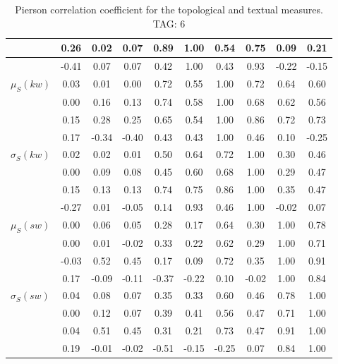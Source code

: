\begin{table*}[h!]
\begin{center}
\begin{tabular}{| l | c | c | c | c | c | c | c | c | c |}
 & 0.26  & 0.02  & 0.07  & 0.89  & 1.00  & 0.54  & 0.75  & 0.09  & 0.21 \\\hline
 & -0.41  & 0.07  & 0.07  & 0.42  & 1.00  & 0.43  & 0.93  & -0.22  & -0.15 \\\hline
$\mu_S(kw)$ & 0.03  & 0.01  & 0.00  & 0.72  & 0.55  & 1.00  & 0.72  & 0.64  & 0.60 \\\hline
 & 0.00  & 0.16  & 0.13  & 0.74  & 0.58  & 1.00  & 0.68  & 0.62  & 0.56 \\\hline
 & 0.15  & 0.28  & 0.25  & 0.65  & 0.54  & 1.00  & 0.86  & 0.72  & 0.73 \\\hline
 & 0.17  & -0.34  & -0.40  & 0.43  & 0.43  & 1.00  & 0.46  & 0.10  & -0.25 \\\hline
$\sigma_S(kw)$ & 0.02  & 0.02  & 0.01  & 0.50  & 0.64  & 0.72  & 1.00  & 0.30  & 0.46 \\\hline
 & 0.00  & 0.09  & 0.08  & 0.45  & 0.60  & 0.68  & 1.00  & 0.29  & 0.47 \\\hline
 & 0.15  & 0.13  & 0.13  & 0.74  & 0.75  & 0.86  & 1.00  & 0.35  & 0.47 \\\hline
 & -0.27  & 0.01  & -0.05  & 0.14  & 0.93  & 0.46  & 1.00  & -0.02  & 0.07 \\\hline
$\mu_S(sw)$ & 0.00  & 0.06  & 0.05  & 0.28  & 0.17  & 0.64  & 0.30  & 1.00  & 0.78 \\\hline
 & 0.00  & 0.01  & -0.02  & 0.33  & 0.22  & 0.62  & 0.29  & 1.00  & 0.71 \\\hline
 & -0.03  & 0.52  & 0.45  & 0.17  & 0.09  & 0.72  & 0.35  & 1.00  & 0.91 \\\hline
 & 0.17  & -0.09  & -0.11  & -0.37  & -0.22  & 0.10  & -0.02  & 1.00  & 0.84 \\\hline
$\sigma_S(sw)$ & 0.04  & 0.08  & 0.07  & 0.35  & 0.33  & 0.60  & 0.46  & 0.78  & 1.00 \\\hline
 & 0.00  & 0.12  & 0.07  & 0.39  & 0.41  & 0.56  & 0.47  & 0.71  & 1.00 \\\hline
 & 0.04  & 0.51  & 0.45  & 0.31  & 0.21  & 0.73  & 0.47  & 0.91  & 1.00 \\\hline
 & 0.19  & -0.01  & -0.02  & -0.51  & -0.15  & -0.25  & 0.07  & 0.84  & 1.00 \\\hline
\end{tabular}
\caption{Pierson correlation coefficient for the topological and textual measures. TAG: 6}
\end{center}
\end{table*}
